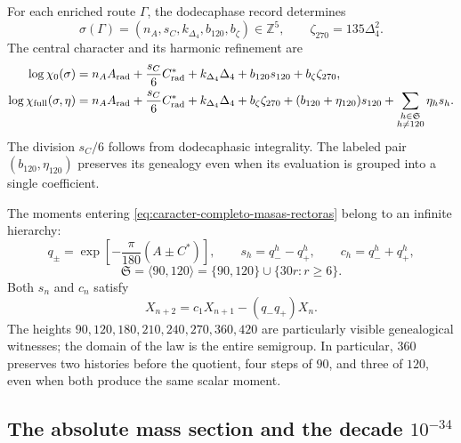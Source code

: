 For each enriched route \(\Gamma\), the dodecaphase record determines
\begin{equation}
 \sigma(\Gamma)
 =(n_A,s_C,k_{\Delta_4},b_{120},b_\zeta)\in\mathbb Z^5,
 \qquad \zeta_{270}=135\Delta_4^2.
 \label{eq:firma-z5-masas-rectoras}
\end{equation}
The central character and its harmonic refinement are
\begin{align}
 \log\chi_0(\sigma)
 &=n_A A_{\rm rad}+\frac{s_C}{6}C^*_{\rm rad}
   +k_{\Delta_4}\Delta_4+b_{120}s_{120}+b_\zeta\zeta_{270},
 \label{eq:caracter-central-masas-rectoras}\\
 \log\chi_{\rm full}(\sigma,\eta)
 &=n_A A_{\rm rad}+\frac{s_C}{6}C^*_{\rm rad}
   +k_{\Delta_4}\Delta_4+b_\zeta\zeta_{270}
   +(b_{120}+\eta_{120})s_{120}
   +\sum_{\substack{h\in\mathfrak S\\h\ne120}}\eta_hs_h.
 \label{eq:caracter-completo-masas-rectoras}
\end{align}
The division \(s_C/6\) follows from dodecaphasic integrality. The labeled pair
\((b_{120},\eta_{120})\) preserves its genealogy even when its evaluation is
grouped into a single coefficient.

The moments entering
\eqref{eq:caracter-completo-masas-rectoras} belong to an infinite hierarchy:
\begin{equation}
 q_\pm=\exp\!\left[-\frac{\pi}{180}(A\pm C^*)\right],
 \qquad s_h=q_-^h-q_+^h,\qquad c_h=q_-^h+q_+^h,
 \label{eq:momentos-torres-masas-rectoras}
\end{equation}
\begin{equation}
 \mathfrak S=\langle90,120\rangle
 =\{90,120\}\cup\{30r:r\ge6\}.
 \label{eq:semigrupo-global-torres-masas-rectoras}
\end{equation}
Both \(s_n\) and \(c_n\) satisfy
\begin{equation}
 X_{n+2}=c_1X_{n+1}-(q_-q_+)X_n.
 \label{eq:recurrencia-torres-masas-rectoras}
\end{equation}
The heights \(90,120,180,210,240,270,360,420\) are particularly visible genealogical
witnesses; the domain of the law is the entire semigroup. In
particular, \(360\) preserves two histories before the quotient, four steps of
\(90\), and three of \(120\), even when both produce the same scalar moment.

\subsection{The absolute mass section and the decade \texorpdfstring{\(10^{-34}\)}{10⁻³⁴}}

